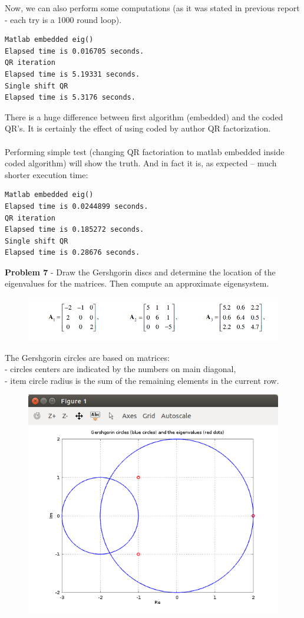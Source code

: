 \documentclass[eng,openany]{mgr}
\begin{document}
Now, we can also perform some computations (as it was stated in previous report - each try is a 1000 round loop).
\\
\begin{lstlisting}
Matlab embedded eig()
Elapsed time is 0.016705 seconds.
QR iteration
Elapsed time is 5.19331 seconds.
Single shift QR
Elapsed time is 5.3176 seconds.
\end{lstlisting}
There is a huge difference between first algorithm (embedded) and the coded QR's. It is certainly the effect of using coded by author QR factorization.
\\
\\
Performing simple test (changing QR factoriation to matlab embedded inside coded algorithm) will show the truth. And in fact it is, as expected -- much shorter execution time:
\begin{lstlisting}
Matlab embedded eig()
Elapsed time is 0.0244899 seconds.
QR iteration
Elapsed time is 0.185272 seconds.
Single shift QR
Elapsed time is 0.28676 seconds.
\end{lstlisting}
\newpage
\textbf{Problem 7} - Draw the Gershgorin discs and determine the location of the eigenvalues for the matrices. Then compute an approximate eigensystem.
\begin{figure}[h]
\centering
\includegraphics[width=0.7\linewidth]{screenshot009}
\label{fig:screenshot009}
\end{figure}

The Gershgorin circles are based on matrices:\\
- circles centers are indicated by the numbers on main diagonal,\\
- item circle radius is the sum of the remaining elements in the current row.\\
\begin{figure}[h]
\centering
\includegraphics[width=0.5\linewidth]{screenshot010}
\label{fig:screenshot010}
\end{figure}
\end{document}
